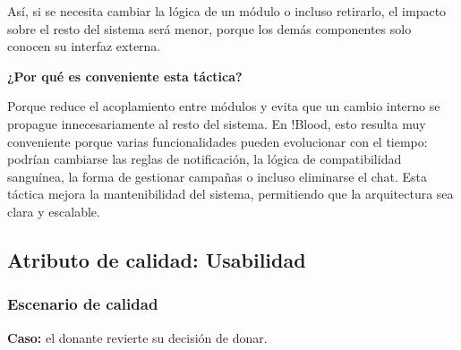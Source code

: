 Así, si se necesita cambiar la lógica de un módulo o incluso retirarlo, el impacto sobre el resto del sistema será menor, porque los demás componentes solo conocen su interfaz externa.

\medskip
\noindent\textbf{¿Por qué es conveniente esta táctica?}

Porque reduce el acoplamiento entre módulos y evita que un cambio interno se propague innecesariamente al resto del sistema. En !Blood, esto resulta muy conveniente porque varias funcionalidades pueden evolucionar con el tiempo: podrían cambiarse las reglas de notificación, la lógica de compatibilidad sanguínea, la forma de gestionar campañas o incluso eliminarse el chat. Esta táctica mejora la mantenibilidad del sistema, permitiendo que la arquitectura sea clara y escalable.

\subsection{Atributo de calidad: Usabilidad}

\subsubsection{Escenario de calidad}

\textbf{Caso:} el donante revierte su decisión de donar.

